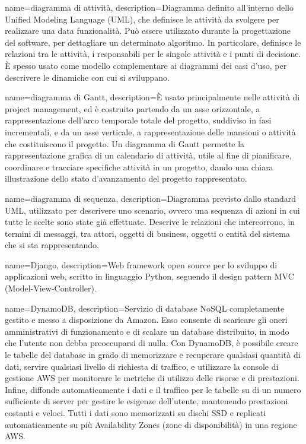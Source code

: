 {
	name=diagramma di attività,
	description={Diagramma definito all'interno dello Unified Modeling Language (UML), che definisce le attività da svolgere per realizzare una data funzionalità. Può essere utilizzato durante la progettazione del software, per dettagliare un determinato algoritmo. In particolare, definisce le relazioni tra le attività, i responsabili per le singole attività e i punti di decisione. \MakeUppercase{è} spesso usato come modello complementare ai diagrammi dei casi d'uso, per descrivere le dinamiche con cui si sviluppano.}
}

{
	name=diagramma di Gantt,
	description={\MakeUppercase{è} usato principalmente nelle attività di project management, ed è costruito partendo da un asse orizzontale, a rappresentazione dell'arco temporale totale del progetto, suddiviso in fasi incrementali, e da un asse verticale, a rappresentazione delle mansioni o attività che costituiscono il progetto. Un diagramma di Gantt permette la rappresentazione grafica di un calendario di attività, utile al fine di pianificare, coordinare e tracciare specifiche attività in un progetto, dando una chiara illustrazione dello stato d'avanzamento del progetto rappresentato.}
}

{
	name=diagramma di sequenza,
	description={Diagramma previsto dallo standard UML, utilizzato per descrivere uno scenario, ovvero una sequenza di azioni in cui tutte le scelte sono state già effettuate. Descrive le relazioni che intercorrono, in termini di messaggi, tra attori, oggetti di business, oggetti o entità del sistema che si sta rappresentando.}
}

{
	name=Django,
	description={Web framework open source per lo sviluppo di applicazioni web, scritto in linguaggio Python, seguendo il design pattern MVC (Model-View-Controller).}
}

{
	name=DynamoDB,
	description={Servizio di database NoSQL completamente gestito e messo a disposizione da Amazon. Esso consente di scaricare gli oneri amministrativi di funzionamento e di scalare un database distribuito, in modo che l'utente non debba preoccuparsi di nulla.
	Con DynamoDB, è possibile creare le tabelle del database in grado di memorizzare e recuperare qualsiasi quantità di dati, servire qualsiasi livello di richiesta di traffico, e utilizzare la console di gestione AWS per monitorare le metriche di utilizzo delle risorse e di prestazioni. Infine, diffonde automaticamente i dati e il traffico per le tabelle su di un numero sufficiente di server per gestire le esigenze dell'utente, mantenendo prestazioni costanti e veloci. Tutti i dati sono memorizzati su dischi SSD e replicati automaticamente su più Availability Zones (zone di disponibilità) in una regione AWS.}
}
